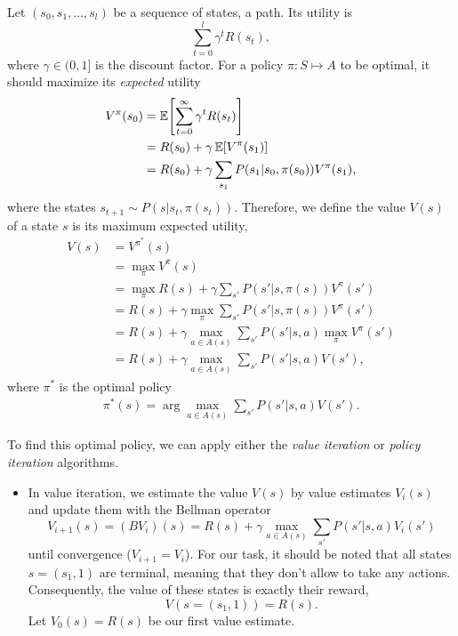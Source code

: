\documentclass[11pt, a4paper]{article}
\begin{document}
\begin{enumerate}
    \begin{solution}
        Let $(s_0, s_1, \dots, s_l)$ be a sequence of states, \ie{} a path. Its utility is
        \begin{equation*}
            \sum_{t = 0}^{l} \gamma^t R(s_t),
        \end{equation*}
        where $\gamma \in (0, 1]$ is the discount factor. For a policy $\pi : S \mapsto A$ to be optimal, it should maximize its \emph{expected} utility
        \begin{align*}
            V^\pi(s_0) & = \E \sbk*{\sum_{t = 0}^\infty \gamma^t R(s_t)} \\
            & = R(s_0) + \gamma \, \E \sbk*{V^\pi(s_1)} \\
            & = R(s_0) + \gamma \sum_{s_1} P(s_1 | s_0, \pi(s_0)) V^\pi(s_1),
        \end{align*}
        where the states $s_{t+1} \sim P(s | s_t, \pi(s_t))$. Therefore, we define the value $V(s)$ of a state $s$ is its maximum expected utility, \ie{}
        \begin{align*}
            V(s) & = V^{\pi^*}(s) \\
            & = \max_\pi V^\pi(s) \\
            & = \max_\pi R(s) + \gamma \sum_{s'} P(s' | s, \pi(s)) V^\pi(s') \\
            & = R(s) + \gamma \max_\pi \sum_{s'} P(s' | s, \pi(s)) V^\pi(s') \\
            & = R(s) + \gamma \max_{a \in A(s)} \sum_{s'} P(s' | s, a) \max_\pi V^\pi(s') \\
            & = R(s) + \gamma \max_{a \in A(s)} \sum_{s'} P(s' | s, a) V(s') ,
        \end{align*}
        where $\pi^*$ is the optimal policy
        \begin{align*}
            \pi^*(s) = \arg \max_{a \in A(s)} \sum_{s'} P(s' | s, a) V(s') .
        \end{align*}

        To find this optimal policy, we can apply either the \emph{value iteration} or \emph{policy iteration} algorithms.

        \begin{itemize}
            \item In value iteration, we estimate the value $V(s)$ by value estimates $V_i(s)$ and update them with the Bellman operator
            \begin{equation*}
                V_{i+1}(s) = (B V_i)(s) = R(s) + \gamma \max_{a \in A(s)} \sum_{s'} P(s' | s, a) V_{i}(s')
            \end{equation*}
            until convergence ($V_{i + 1} = V_i$). For our task, it should be noted that all states $s = (s_1, 1)$ are terminal, meaning that they don't allow to take any actions. Consequently, the value of these states is exactly their reward, \ie{}
            \begin{equation*}
                V(s = (s_1, 1)) = R(s) .
            \end{equation*}
            Let $V_0(s) = R(s)$ be our first value estimate.


\end{itemize}
\end{solution}
\end{enumerate}
\end{document}
